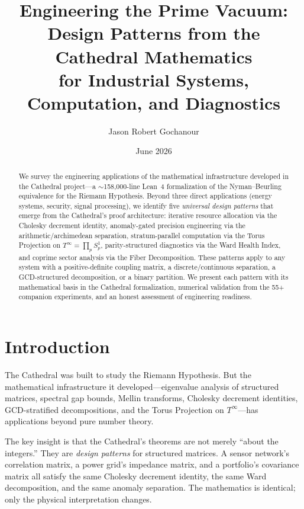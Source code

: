 \documentclass[11pt,a4paper]{article}
\title{%
  Engineering the Prime Vacuum:\\
  Design Patterns from the Cathedral Mathematics\\
  for Industrial Systems, Computation, and Diagnostics%
}
\author{Jason Robert Gochanour}
\date{June 2026}
\begin{document}
\maketitle

\begin{abstract}
We survey the engineering applications of the mathematical
infrastructure developed in the Cathedral project---a
$\sim$158{,}000-line Lean~4 formalization of the Nyman--Beurling
equivalence for the Riemann Hypothesis. Beyond three direct
applications (energy systems, security, signal processing),
we identify five \emph{universal design patterns} that emerge from the
Cathedral's proof architecture: iterative resource allocation via the
Cholesky decrement identity, anomaly-gated precision engineering via
the arithmetic/archimedean separation, stratum-parallel computation
via the Torus Projection on $T^\infty = \prod_p S^1_p$,
parity-structured diagnostics via the Ward Health Index, and
coprime sector analysis via the Fiber Decomposition.
These patterns apply to any system with a positive-definite
coupling matrix, a discrete/continuous separation, a GCD-structured
decomposition, or a binary partition.  We present each pattern with
its mathematical basis in the Cathedral formalization, numerical
validation from the 55+ companion experiments, and an honest assessment
of engineering readiness.
\end{abstract}

\tableofcontents

\section{Introduction}

The Cathedral was built to study the Riemann Hypothesis. But the
mathematical infrastructure it developed---eigenvalue analysis of
structured matrices, spectral gap bounds, Mellin transforms,
Cholesky decrement identities, GCD-stratified decompositions, and
the Torus Projection on $T^\infty$---has applications beyond pure number
theory.

The key insight is that the Cathedral's theorems are not merely
``about the integers.'' They are \emph{design patterns} for
structured matrices. A sensor network's correlation matrix, a
power grid's impedance matrix, and a portfolio's covariance matrix
all satisfy the same Cholesky decrement identity, the same Ward
decomposition, and the same anomaly separation. The mathematics
is identical; only the physical interpretation changes.
\end{document}
